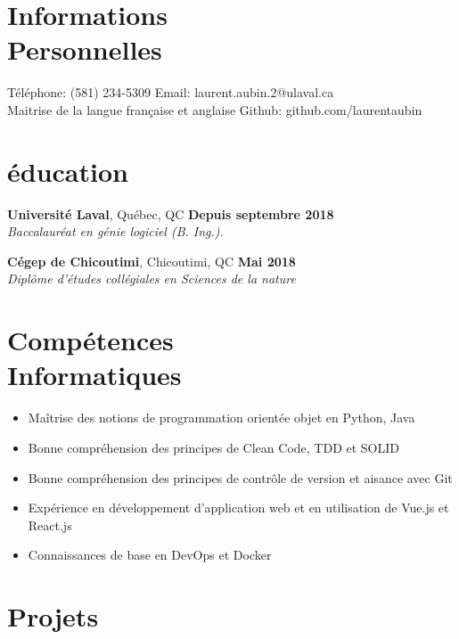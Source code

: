 \documentclass[margin,line]{resume}
\begin{document}
\begin{resume}
    \section{\mysidestyle Informations\\Personnelles}

    Téléphone: (581) 234-5309     \hfill \noindent Email: laurent.aubin.2@ulaval.ca \\
    Maitrise de la langue française et anglaise \hfill \noindent Github: github.com/laurentaubin
    

    \section{\mysidestyle éducation}

    \textbf{Université Laval}, Québec, QC \hfill \textbf{Depuis septembre 2018} \vspace{2mm}\\\vspace{1mm}%
    \textsl{Baccalauréat en génie logiciel (B. Ing.).}
    
      \textbf{Cégep de Chicoutimi}, Chicoutimi, QC \hfill \textbf{Mai 2018} \vspace{2mm}\\\vspace{1mm}%
    \textsl{Diplôme d'études collégiales en Sciences de la nature} 
  
    
    \section{\mysidestyle Compétences\\Informatiques}
     \begin{itemize}[nosep]
        \item Maîtrise des notions de programmation orientée objet en Python, Java
        \item Bonne compréhension des principes de Clean Code, TDD et SOLID
        \item Bonne compréhension des principes de contrôle de version et aisance avec Git
        \item Expérience en développement d'application web et en utilisation de Vue.js et React.js
        \item Connaissances de base en DevOps et Docker
    \end{itemize}

    \section{\mysidestyle Projets}
    

\end{resume}
\end{document}
